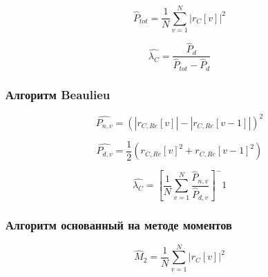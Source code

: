 \begin{center}
\begin{equation}
	\hat P_{tot} = \frac{1}{N} \sum \limits_{v=1}^{N} \left|r_C[v] \right| ^2
\end{equation}
\end{center}

\begin{center}
\begin{equation}
	\hat{\lambda_C} = \frac{\hat P_d}{\hat P_{tot} - \hat P_d}
\end{equation}
\end{center}

\subsubsection{Алгоритм Beaulieu}
\begin{center}
\begin{equation}
	\hat{P_{n,v}} = (\left| r_{C,Re}[v] \right| - \left| r_{C,Re}[v-1] \right|)^2
\end{equation}
\end{center}

\begin{center}
\begin{equation}
	\hat{P_{d,v}} = \frac{1}{2}(r_{C,Re}[v]^2 + r_{C,Re}[v-1]^2)
\end{equation}
\end{center}

\begin{center}
\begin{equation}
	\hat{\lambda_C} = [ \frac{1}{N} \sum \limits_{v=1}^{N} \frac{\hat P_{n,v}}{\hat P_{d,v}} ]^-1
\end{equation}
\end{center}

\subsubsection{Алгоритм основанный на методе моментов}
\begin{center}
\begin{equation}
	\hat M_2 = \frac{1}{N} \sum \limits_{v=1}^{N} \left|r_C[v] \right| ^2
\end{equation}
\end{center}

